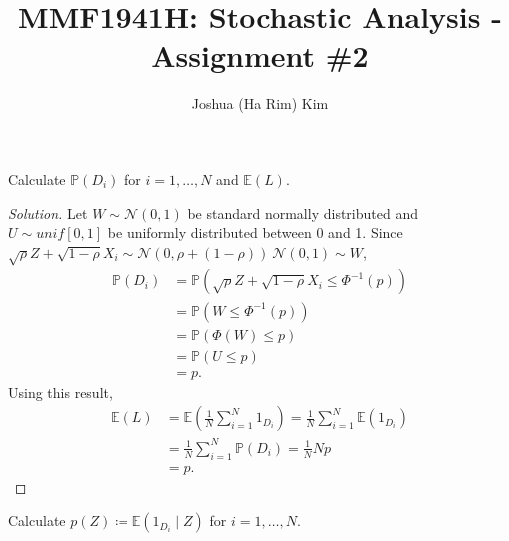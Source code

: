 \documentclass[10pt]{article}
\newcommand{\E}{\mathbb{E}}
\newenvironment{problem}[2][Problem]{\begin{trivlist}
\item[\hskip \labelsep {\bfseries #1}\hskip \labelsep {\bfseries #2.}]}{\end{trivlist}}
\begin{document}
\title{MMF1941H: Stochastic Analysis - Assignment \#2}
\author{Joshua (Ha Rim) Kim}
\maketitle



\begin{problem}{1}
    Calculate $\mathbb{P}(D_i)$ for $i = 1, \ldots, N$ and $\E(L)$.
\end{problem}

\begin{proof}[Solution]
    Let $W \sim \mathcal{N}(0, 1)$ be standard normally distributed and $U \sim unif[0,1]$ be uniformly distributed between 0 and 1.
    Since $\sqrt{\rho} Z + \sqrt{1 - \rho} X_i \sim \mathcal{N}(0, \rho + (1 - \rho)) ~ \mathcal{N}(0,1) \sim W$,
    \begin{align*}
        \mathbb{P}(D_i) &= \mathbb{P}(\sqrt{\rho} Z + \sqrt{1 - \rho} X_i \leq \Phi^{-1}(p)) \\
        &= \mathbb{P}(W \leq \Phi^{-1}(p)) \\
        &= \mathbb{P}(\Phi(W) \leq p) \\
        &= \mathbb{P}(U \leq p) \\
        &= p.
    \end{align*}
    Using this result,
    \begin{align*}
        \E(L) &= \E \left(\frac{1}{N} \sum_{i=1}^N 1_{D_i} \right) = \frac{1}{N} \sum_{i=1}^{N} \E(1_{D_i}) \\
        &= \frac{1}{N} \sum_{i=1}^{N} \mathbb{P}(D_i) = \frac{1}{N} N p \\
        &= p.
    \end{align*}
\end{proof}



\begin{problem}{2}
    Calculate $p(Z) \coloneq \E(1_{D_i} \mid Z)$ for $i = 1, \ldots, N$.
\end{problem}
\end{document}
